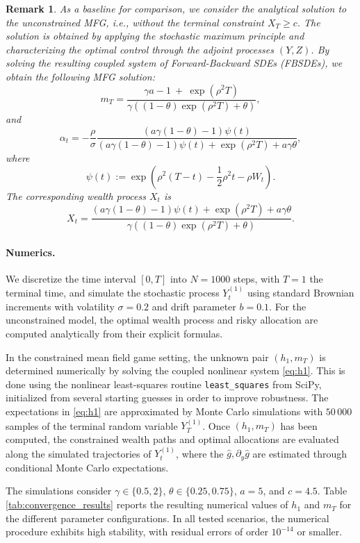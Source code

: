 \documentclass[11pt,a4paper]{article}
\newtheorem{rem}[theo]{Remark}
\begin{document}
\begin{rem}
   As a baseline for comparison, we consider the analytical solution to the unconstrained MFG, i.e., without the terminal constraint $X_T \geq c$.  The solution is obtained by applying the stochastic maximum principle and characterizing the optimal control through the adjoint processes $(Y, Z)$. By solving the resulting coupled system of Forward-Backward SDEs (FBSDEs), we obtain the following MFG solution: 
   \[
m_T = \frac{ \gamma a-1\   + \  \exp(\rho^2T)  }{ \gamma \left( (1 - \theta)\exp(\rho^2T) +\theta  \right) },
\]
and 
\[
\alpha_t=-\dfrac{\rho}{\sigma}\dfrac{(a\gamma(1-\theta)-1)\psi(t)}{(a\gamma(1-\theta)-1)\psi(t)+\exp(\rho^2 T)+a\gamma \theta},
\]
where $$\psi(t):=\exp \left(\rho^2(T-t) -\dfrac{1}{2}\rho^2 t - \rho  W_t\right).$$
The corresponding  wealth process ${X}_t$ is
\begin{equation*}
  X_t=\dfrac{(a\gamma(1-\theta)-1)\psi(t)+\exp(\rho^2T)+a\gamma\theta}{\gamma((1-\theta)\exp(\rho^2T )+\theta)}.
\end{equation*}

\end{rem}

\paragraph{Numerics.}
We discretize the time interval $[0,T]$ into $N=1000$ steps, with $T=1$ the terminal time, and simulate the stochastic process $Y_t^{(1)}$ using standard Brownian increments with volatility $\sigma=0.2$ and drift parameter $b=0.1$. For the unconstrained model, the optimal wealth process and risky allocation are computed analytically from their explicit formulas.

In the constrained mean field game setting, the unknown pair $(h_1,m_T)$ is determined numerically by solving the coupled nonlinear system \eqref{eq:h1}. This is done using the nonlinear least-squares routine \texttt{least\_squares} from SciPy, initialized from several starting guesses in order to improve robustness. The expectations in \eqref{eq:h1} are approximated by Monte Carlo simulations with $50\,000$ samples of the terminal random variable $Y_T^{(1)}$. Once $(h_1,m_T)$ has been computed, the constrained wealth paths and optimal allocations are evaluated along the simulated trajectories of $Y_t^{(1)}$, where the $\hat{g}, \partial_y \hat{g} $ are estimated through conditional Monte Carlo expectations.

The simulations consider $\gamma\in\{0.5,2\}$, $\theta\in\{0.25,0.75\}$, $a=5$, and $c=4.5$. Table \ref{tab:convergence_results} reports the resulting numerical values of $h_1$ and $m_T$ for the different parameter configurations. In all tested scenarios, the numerical procedure exhibits high stability, with residual errors of order $10^{-14}$ or smaller.
\end{document}
